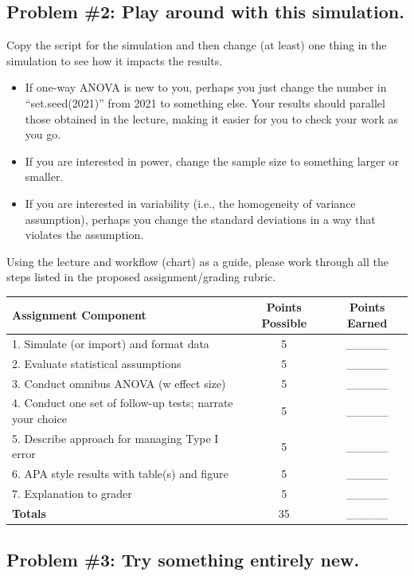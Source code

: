 \documentclass[
  english,
]{book}
\providecommand{\tightlist}{%
  \setlength{\itemsep}{0pt}\setlength{\parskip}{0pt}}
\begin{document}
\hypertarget{problem-2-play-around-with-this-simulation.}{%
\subsection{Problem \#2: Play around with this simulation.}\label{problem-2-play-around-with-this-simulation.}}

Copy the script for the simulation and then change (at least) one thing in the simulation to see how it impacts the results.

\begin{itemize}
\tightlist
\item
  If one-way ANOVA is new to you, perhaps you just change the number in ``set.seed(2021)'' from 2021 to something else. Your results should parallel those obtained in the lecture, making it easier for you to check your work as you go.
\item
  If you are interested in power, change the sample size to something larger or smaller.
\item
  If you are interested in variability (i.e., the homogeneity of variance assumption), perhaps you change the standard deviations in a way that violates the assumption.
\end{itemize}

Using the lecture and workflow (chart) as a guide, please work through all the steps listed in the proposed assignment/grading rubric.

\begin{longtable}[]{@{}lcc@{}}
\toprule
Assignment Component & Points Possible & Points Earned\tabularnewline
\midrule
\endhead
1. Simulate (or import) and format data & 5 & \_\_\_\_\_\tabularnewline
2. Evaluate statistical assumptions & 5 & \_\_\_\_\_\tabularnewline
3. Conduct omnibus ANOVA (w effect size) & 5 & \_\_\_\_\_\tabularnewline
4. Conduct one set of follow-up tests; narrate your choice & 5 & \_\_\_\_\_\tabularnewline
5. Describe approach for managing Type I error & 5 & \_\_\_\_\_\tabularnewline
6. APA style results with table(s) and figure & 5 & \_\_\_\_\_\tabularnewline
7. Explanation to grader & 5 & \_\_\_\_\_\tabularnewline
\textbf{Totals} & 35 & \_\_\_\_\_\tabularnewline
\bottomrule
\end{longtable}

\hypertarget{problem-3-try-something-entirely-new.}{%
\subsection{Problem \#3: Try something entirely new.}\label{problem-3-try-something-entirely-new.}}
\end{document}
